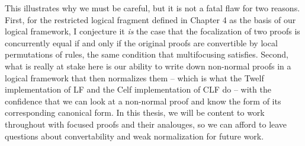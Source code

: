 This illustrates why we must be careful, but it is not a fatal flaw
for two reasons. First, for the restricted logical fragment defined in
Chapter 4 as the basis of our logical framework, I conjecture it {\it
  is} the case that the focalization of two proofs is concurrently
equal if and only if the original proofs are convertible by local
permutations of rules, the same condition that
multifocusing satisfies. Second, what is really at stake here is our
ability to write down non-normal proofs in a logical framework that
then normalizes them -- which is what the Twelf implementation of LF
and the Celf implementation of CLF do -- with the confidence that we
can look at a non-normal proof and know the form of its corresponding
canonical form. In this thesis, we will be content to work throughout
with focused proofs and their analouges, so we can afford to leave
questions about convertability and weak normalization for future work.
